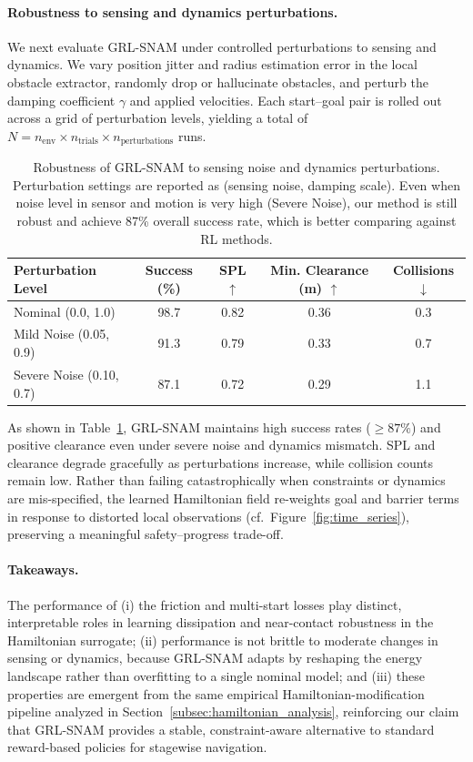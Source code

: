 \paragraph{Robustness to sensing and dynamics perturbations.}
We next evaluate GRL-SNAM under controlled perturbations to sensing and dynamics.
We vary position jitter and radius estimation error in the local obstacle extractor, randomly drop or hallucinate obstacles, and perturb the damping coefficient $\gamma$ and applied velocities.
Each start–goal pair is rolled out across a grid of perturbation levels, yielding a total of $N = n_{\text{env}} \times n_{\text{trials}} \times n_{\text{perturbations}}$ runs.

\begin{table}[htbp]
\centering
\caption{Robustness of GRL-SNAM to sensing noise and dynamics perturbations.
Perturbation settings are reported as (sensing noise, damping scale). { Even when noise level in sensor and motion is very high (Severe Noise), our method is still robust and achieve 87\% overall success rate, which is better comparing against RL methods.}}
\label{tab:robustness}
\vspace{0.5em}
\begin{tabular}{lcccc}
\toprule
Perturbation Level & Success (\%) & SPL $\uparrow$ & Min. Clearance (m) $\uparrow$ & Collisions $\downarrow$ \\
\midrule
Nominal (0.0, 1.0)      & 98.7 & 0.82 & 0.36 & 0.3 \\
Mild Noise (0.05, 0.9)  & 91.3 & 0.79 & 0.33 & 0.7 \\
Severe Noise (0.10, 0.7) & 87.1 & 0.72 & 0.29 & 1.1 \\
\bottomrule
\end{tabular}
\end{table}

As shown in Table~\ref{tab:robustness}, GRL-SNAM maintains high success rates ($\geq 87\%$) and positive clearance even under severe noise and dynamics mismatch.
SPL and clearance degrade gracefully as perturbations increase, while collision counts remain low.
Rather than failing catastrophically when constraints or dynamics are mis-specified, the learned Hamiltonian field re-weights goal and barrier terms in response to distorted local observations (cf.\ Figure~\ref{fig:time_series}), preserving a meaningful safety–progress trade-off.

\paragraph{Takeaways.}
The performance of
(i) the friction and multi-start losses play distinct, interpretable roles in learning dissipation and near-contact robustness in the Hamiltonian surrogate;
(ii) performance is not brittle to moderate changes in sensing or dynamics, because GRL-SNAM adapts by reshaping the energy landscape rather than overfitting to a single nominal model; and
(iii) these properties are emergent from the same empirical Hamiltonian-modification pipeline analyzed in Section~\ref{subsec:hamiltonian_analysis}, reinforcing our claim that GRL-SNAM provides a stable, constraint-aware alternative to standard reward-based policies for stagewise navigation.

